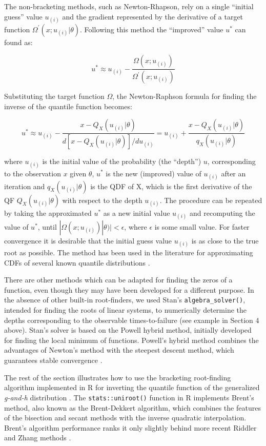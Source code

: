 \documentclass[
  12pt,
]{article}
\begin{document}
The non-bracketing methods, such as Newton-Rhapson, rely on a single ``initial guess'' value \(u_{(i)}\) and the gradient represented by the derivative of a target function \(\Omega^\prime(x;u_{(i)}|\theta)\). Following this method the ``improved'' value \(u^*\) can found as:

\[
u^*\approx u_{(i)} -\frac{\Omega(x;u_{(i)})}{\Omega^\prime(x;u_{(i)})}
\]

Substituting the target function \(\Omega\), the Newton-Raphson formula for finding the inverse of the quantile function becomes:

\[
u^*\approx u_{(i)}-\frac{x-Q_X(u_{(i)}|\theta)}{d[x-Q_X(u_{(i)}|\theta)]/du_{(i)}}= u_{(i)}+\frac{x-Q_X(u_{(i)}|\theta)}{q_X(u_{(i)}|\theta)}
\]

where \(u_{(i)}\) is the initial value of the probability (the ``depth'') \(u\), corresponding to the observation \(x\) given \(\theta\), \(u^*\) is the new (improved) value of \(u_{(i)}\) after an iteration and \(q_X(u_{(i)}|\theta)\) is the QDF of X, which is the first derivative of the QF \(Q_X(u_{(i)}|\theta)\) with respect to the depth \(u_{(i)}\). The procedure can be repeated by taking the approximated \(u^*\) as a new initial value \(u_{(i)}\) and recomputing the value of \(u^*\), until \(|\Omega(x;u_{(i)})|\theta)|< \epsilon\), where \(\epsilon\) is some small value. For faster convergence it is desirable that the initial guess value \(u_{(i)}\) is as close to the true root as possible. The method has been used in the literature for approximating CDFs of several known quantile distributions \citetext{\citealp[see p.99 in][]{gilchrist2000StatisticalModellingQuantile}; \citealp[p.345 in][]{nair2013QuantileBasedReliabilityAnalysis}}.

There are other methods which can be adapted for finding the zeros of a function, even though they may have been developed for a different purpose. In the absence of other built-in root-finders, we used Stan's \texttt{algebra\_solver()}, intended for finding the roots of linear systems, to numerically determine the depths corresponding to the observable times-to-failure (see example in Section 4 above). Stan's solver is based on the Powell hybrid method, initially developed for finding the local minimum of functions. Powell's hybrid method combines the advantages of Newton's method with the steepest descent method, which guarantees stable convergence \citep{powell1970HybridMethodNonlinear}.

The rest of the section illustrates how to use the bracketing root-finding algorithm implemented in R for inverting the quantile function of the generalized \emph{g-and-h} distribution \citep{rayner2002NumericalMaximumLikelihood}. The \texttt{stats::uniroot()} function in R implements Brent's method, also known as the Brent-Dekkert algorithm, which combines the features of the bisection and secant methods with the inverse quadratic interpolation. Brent's algorithm performance ranks it only slightly behind more recent Riddler and Zhang methods \citep{stage2013CommentsImprovementBrent, zhang2011ImprovementBrentMethod}.
\end{document}
